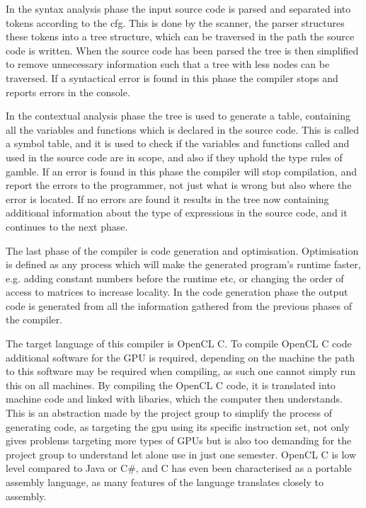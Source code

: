 In the syntax analysis phase the input source code is parsed and separated into tokens according to the \acrshort{cfg}.
This is done by the scanner, the parser structures these tokens into a tree structure, which can be traversed in the path the source code is written.
When the source code has been parsed the tree is then simplified to remove unnecessary information such that a tree with less nodes can be traversed.
If a syntactical error is found in this phase the compiler stops and reports errors in the console.

In the contextual analysis phase the tree is used to generate a table, containing all the variables and functions which is declared in the source code.
This is called a symbol table, and it is used to check if the variables and functions called and used in the source code are in scope, and also if they uphold the type rules of \gls{gamble}.
If an error is found in this phase the compiler will stop compilation, and report the errors to the programmer, not just what is wrong but also where the error is located.
If no errors are found it results in the tree now containing additional information about the type of expressions in the source code, and it continues to the next phase.

The last phase of the compiler is code generation and optimisation.
Optimisation is  defined as any process which will make the generated program's runtime faster, e.g. adding constant numbers before the runtime etc, or changing the order of access to matrices to increase locality. 
In the code generation phase the output code is generated from all the information gathered from the previous phases of the compiler.

The target language of this compiler is OpenCL C.
To compile OpenCL C code additional software for the GPU is required, depending on the machine the path to this software may be required when compiling, as such one cannot simply run this on all machines.
By compiling the OpenCL C code, it is translated into machine code and linked with libaries, which the computer then understands.
This is an abstraction made by the project group to simplify the process of generating code, as targeting the \acrshort{gpu} using its specific instruction set, not only gives problems targeting more types of GPUs but is also too demanding for the project group to understand let alone use in just one semester.
OpenCL C is low level compared to Java or C\#, and C has even been characterised as a portable assembly language, as many features of the language translates closely to assembly. \citep{CPort}

